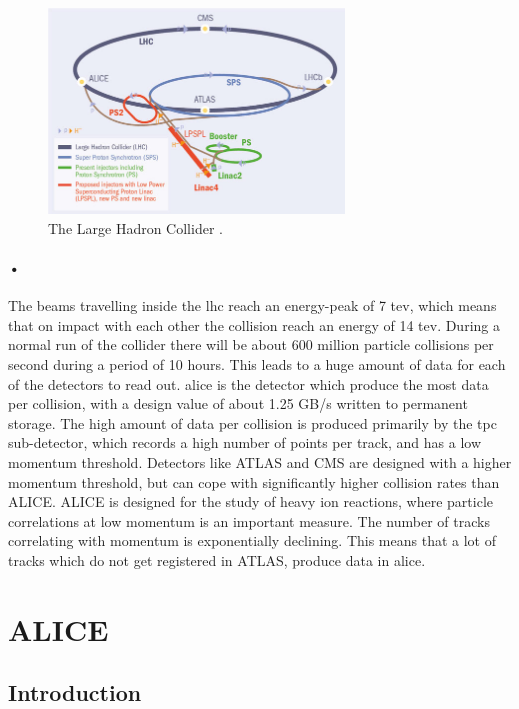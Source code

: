 \documentclass[a4paper, 12pt]{report}
\begin{document}
\begin{figure}[h!]
  \centering
    \includegraphics[width=0.7\textwidth]{images/lhc-ring.jpg}
     \caption[The Large Hadron Collider]{The Large Hadron Collider \cite{lhc-ring-image}.}
    \label{fig:lhc}
\end{figure}

\paragraph{•}
The beams travelling inside the \gls{lhc} reach an energy-peak of 7 \gls{tev}, which means that on impact with each other the collision reach an energy of 14 \gls{tev}\cite{lhc-pdf}.
During a normal run of the collider there will be about 600 million particle collisions per second during a period of 10 hours.
This leads to a huge amount of data for each of the detectors to read out.
\gls{alice} is the detector which produce the most data per collision, with a design value of about 1.25 GB/s written to permanent storage.
The high amount of data per collision is produced primarily by the \gls{tpc} sub-detector, which records a high number of points per track, and has a low momentum threshold. Detectors like ATLAS and CMS  are designed with a higher momentum threshold, but can cope with significantly higher collision rates than ALICE.
ALICE is designed for the study of heavy ion reactions, where particle correlations at low momentum is an important measure.
The number of tracks correlating with momentum is exponentially declining.
This means that a lot of tracks which do not get registered in ATLAS, produce data in \gls{alice}.

\section{ALICE}
\subsection{Introduction}
\end{document}
